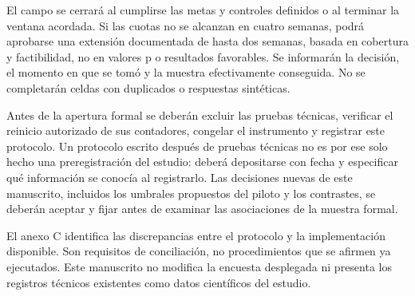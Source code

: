 \documentclass[12pt,letterpaper]{article}
\begin{document}
El campo se cerrará al cumplirse las metas y controles definidos o al terminar la ventana acordada. Si las cuotas no se alcanzan en cuatro semanas, podrá aprobarse una extensión documentada de hasta dos semanas, basada en cobertura y factibilidad, no en valores p o resultados favorables. Se informarán la decisión, el momento en que se tomó y la muestra efectivamente conseguida. No se completarán celdas con duplicados o respuestas sintéticas.

Antes de la apertura formal se deberán excluir las pruebas técnicas, verificar el reinicio autorizado de sus contadores, congelar el instrumento y registrar este protocolo. Un protocolo escrito después de pruebas técnicas no es por ese solo hecho una preregistración del estudio: deberá depositarse con fecha y especificar qué información se conocía al registrarlo. Las decisiones nuevas de este manuscrito, incluidos los umbrales propuestos del piloto y los contrastes, se deberán aceptar y fijar antes de examinar las asociaciones de la muestra formal.

El anexo C identifica las discrepancias entre el protocolo y la implementación disponible. Son requisitos de conciliación, no procedimientos que se afirmen ya ejecutados. Este manuscrito no modifica la encuesta desplegada ni presenta los registros técnicos existentes como datos científicos del estudio.
\end{document}
